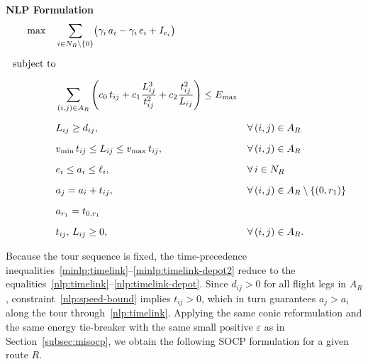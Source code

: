 \documentclass[11pt]{article}
\begin{document}
\vspace{4mm}
\noindent\textbf{NLP Formulation}
\begin{align}
\max \quad
& \sum_{i \in N_R \setminus \{0\}} \bigl(\gamma_i\, a_i - \gamma_i\, e_i + I_{e_i} \bigr) \label{nlp:obj} \\[6pt]
\text{subject to} \notag \\[6pt]
& \sum_{(i,j) \in A_R} \left( c_0\, t_{ij} + c_1 \frac{L_{ij}^3}{t_{ij}^2} + c_2 \frac{t_{ij}^2}{L_{ij}} \right) \le E_{\max} \label{nlp:energy} \\[6pt]
& L_{ij} \ge d_{ij},
    && \forall\, (i,j) \in A_R \label{nlp:path-length} \\[6pt]
& v_{\min}\, t_{ij} \le L_{ij} \le v_{\max}\, t_{ij},
    && \forall\, (i,j) \in A_R \label{nlp:speed-bound} \\[6pt]
& e_i \le a_i \le \ell_i,
    && \forall\, i \in N_R \label{nlp:timewindow} \\[6pt]
& a_j = a_i + t_{ij},
    && \forall\, (i,j) \in A_R \setminus \{(0,r_1)\} \label{nlp:timelink} \\[6pt]
& a_{r_1} = t_{0,r_1} \label{nlp:timelink-depot} \\[6pt]
& t_{ij},\, L_{ij} \ge 0,
    && \forall\, (i,j) \in A_R. \label{nlp:domain}
\end{align}

Because the tour sequence is fixed, the time-precedence inequalities~\eqref{minlp:timelink}--\eqref{minlp:timelink-depot2} reduce to the equalities~\eqref{nlp:timelink}--\eqref{nlp:timelink-depot}. Since $d_{ij}>0$ for all flight legs in $A_R$, constraint~\eqref{nlp:speed-bound} implies $t_{ij}>0$, which in turn guarantees $a_j>a_i$ along the tour through~\eqref{nlp:timelink}. Applying the same conic reformulation and the same energy tie-breaker with the same small positive $\varepsilon$ as in Section~\ref{subsec:misocp}, we obtain the following SOCP formulation for a given route $R$.
\end{document}
